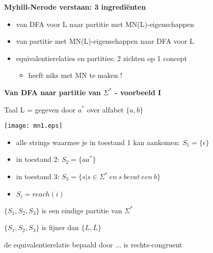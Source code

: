 \documentclass{seminar}
\newcommand{\openpagina}{}
\begin{document}
\begin{slide}

{\bf Myhill-Nerode verstaan: 3 ingredi\"{e}nten}

\begin{itemize}
\item 
van DFA voor L naar partitie met MN(L)-eigenschappen

\item 
van partitie met  MN(L)-eigenschappen naar DFA voor L

\item 
equivalentierelaties en partities: 2 zichten op 1 concept
\begin{itemize}
\item[] {\footnotesize heeft niks met MN te maken !}

\end{itemize}


\end{itemize}

\end{slide} \openpagina

\begin{slide}

{\bf Van DFA naar partitie van $\Sigma^*$ - voorbeeld I}

Taal L = gegeven door $a^*$ over alfabet $\{a,b\}$




\texttt{[image: mn1.eps]}


\begin{itemize}
\item alle strings waarmee je in toestand 1 kan aankomen: $S_1 = \{\epsilon\}$
\item in toestand 2: $S_2 = \{aa^*\}$
\item in toestand 3: $S_3 = \{s|s \in \Sigma^*~en~s~bevat~een~b\}$
\item $S_i = reach(i)$
\end{itemize}

$\{S_1,S_2,S_3\}$ is een eindige partitie van $\Sigma^*$

$\{S_1,S_2,S_3\}$ is fijner dan $\{L, \overline{L}\}$

de equivalentierelatie bepaald door ... is rechts-congruent

\end{slide} \openpagina
\end{document}
